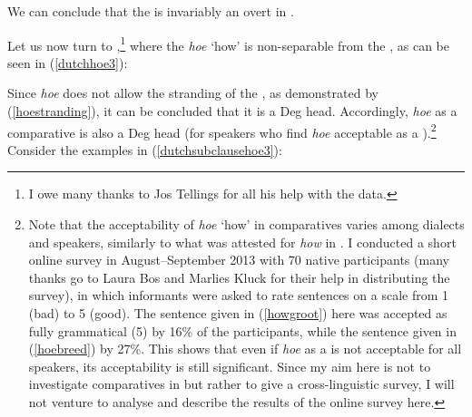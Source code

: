 We can conclude that the  is invariably an overt   in .

Let us now turn to ,\footnote{I owe many thanks to Jos Tellings for all his help with the  data.} where the  \textit{hoe} `how' is non-separable from the , as can be seen in (\ref{dutchhoe3}):

\ea \label{dutchhoe3}
\z
\z
		
Since \textit{hoe} does not allow the stranding of the , as demonstrated by (\ref{hoestranding}), it can be concluded that it is a Deg head. Accordingly, \textit{hoe} as a comparative  is also a Deg head (for speakers who find \textit{hoe} acceptable as a ).\footnote{Note that the acceptability of \textit{hoe} `how' in comparatives varies among dialects and speakers, similarly to what was attested for \textit{how} in . I conducted a short online survey in August–September 2013 with 70 native participants (many thanks go to Laura Bos and Marlies Kluck for their help in distributing the survey), in which informants were asked to rate sentences on a scale from 1 (bad) to 5 (good). The sentence given in (\ref{howgroot}) here was accepted as fully grammatical (5) by 16\% of the participants, while the sentence given in (\ref{hoebreed}) by 27\%. This shows that even if \textit{hoe} as a  is not acceptable for all speakers, its acceptability is still significant. Since my aim here is not to investigate comparatives in  but rather to give a cross-linguistic survey, I will not venture to analyse and describe the results of the online survey here.} Consider the examples in (\ref{dutchsubclausehoe3}):

\ea \label{dutchsubclausehoe3}
\z
\z

